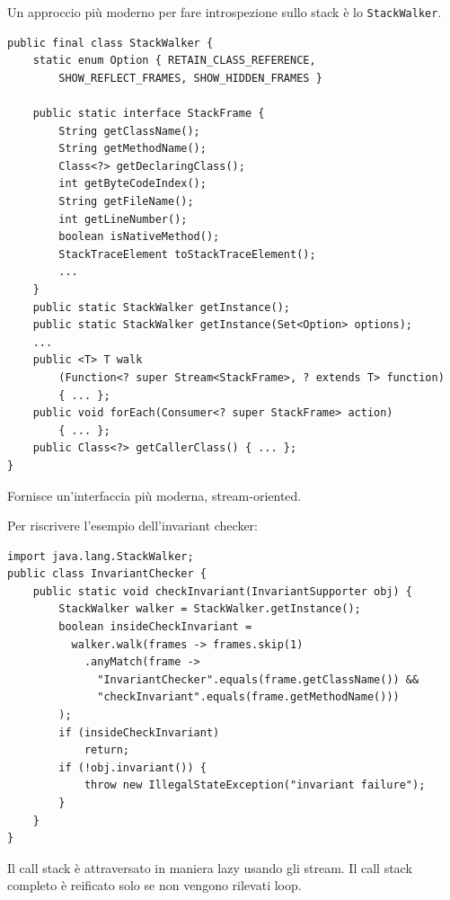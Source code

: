 Un approccio più moderno per fare introspezione sullo stack è lo \texttt{StackWalker}.
\begin{verbatim}
public final class StackWalker {
    static enum Option { RETAIN_CLASS_REFERENCE,
        SHOW_REFLECT_FRAMES, SHOW_HIDDEN_FRAMES }

    public static interface StackFrame {
        String getClassName();
        String getMethodName();
        Class<?> getDeclaringClass();
        int getByteCodeIndex();
        String getFileName();
        int getLineNumber();
        boolean isNativeMethod();
        StackTraceElement toStackTraceElement();
        ...
    }
    public static StackWalker getInstance();
    public static StackWalker getInstance(Set<Option> options);
    ...
    public <T> T walk
        (Function<? super Stream<StackFrame>, ? extends T> function)
        { ... };
    public void forEach(Consumer<? super StackFrame> action)
        { ... };
    public Class<?> getCallerClass() { ... };
}
\end{verbatim}

Fornisce un'interfaccia più moderna, stream-oriented.

Per riscrivere l'esempio dell'invariant checker:
\begin{verbatim}
import java.lang.StackWalker;
public class InvariantChecker {
    public static void checkInvariant(InvariantSupporter obj) {
        StackWalker walker = StackWalker.getInstance();
        boolean insideCheckInvariant =
          walker.walk(frames -> frames.skip(1)
            .anyMatch(frame ->
              "InvariantChecker".equals(frame.getClassName()) &&
              "checkInvariant".equals(frame.getMethodName()))
        );
        if (insideCheckInvariant)
            return;
        if (!obj.invariant()) {
            throw new IllegalStateException("invariant failure");
        }
    }
}
\end{verbatim}

Il call stack è attraversato in maniera lazy usando gli stream. Il call stack completo è reificato solo se non vengono rilevati loop.

